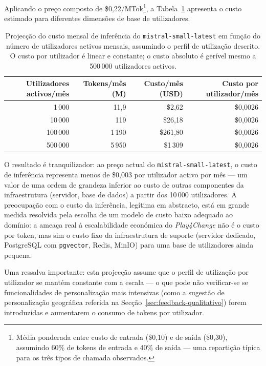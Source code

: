 Aplicando o preço composto de \$0,22/MTok\footnote{Média ponderada entre custo de entrada (\$0,10) e de saída (\$0,30), assumindo 60\% de tokens de entrada e 40\% de saída --- uma repartição típica para os três tipos de chamada observados.}, a Tabela~\ref{tab:custo-escala} apresenta o custo estimado para diferentes dimensões de base de utilizadores.

\begin{table}[h]
    \centering
    \small
    \begin{tabular}{r r r r}
        \toprule
        \textbf{Utilizadores activos/mês} &
        \textbf{Tokens/mês (M)} &
        \textbf{Custo/mês (USD)} &
        \textbf{Custo por utilizador/mês} \\
        \midrule
        1\,000   & 11,9  & \$2,62    & \$0,0026 \\
        10\,000  & 119   & \$26,18   & \$0,0026 \\
        100\,000 & 1\,190 & \$261,80 & \$0,0026 \\
        500\,000 & 5\,950 & \$1\,309  & \$0,0026 \\
        \bottomrule
    \end{tabular}
    \caption[Projecção de custo de inferência a escala]{Projecção do custo mensal de inferência do \texttt{mistral-small-latest} em função do número de utilizadores activos mensais, assumindo o perfil de utilização descrito. O custo por utilizador é linear e constante; o custo absoluto é gerível mesmo a 500\,000 utilizadores activos.}
    \label{tab:custo-escala}
\end{table}

O resultado é tranquilizador: ao preço actual do \texttt{mistral-small-latest}, o custo de inferência representa menos de \$0,003 por utilizador activo por mês --- um valor de uma ordem de grandeza inferior ao custo de outras componentes da infraestrutura (servidor, base de dados) a partir dos 10\,000 utilizadores. A preocupação com o custo da inferência, legítima em abstracto, está em grande medida resolvida pela escolha de um modelo de custo baixo adequado ao domínio: a ameaça real à escalabilidade económica do \emph{Play4Change} não é o custo por token, mas sim o custo fixo da infraestrutura de suporte (servidor dedicado, PostgreSQL com \texttt{pgvector}, Redis, MinIO) para uma base de utilizadores ainda pequena.

Uma ressalva importante: esta projecção assume que o perfil de utilização por utilizador se mantém constante com a escala --- o que pode não verificar-se se funcionalidades de personalização mais intensivas (como a sugestão de personalização geográfica referida na Secção~\ref{sec:feedback-qualitativo}) forem introduzidas e aumentarem o consumo de tokens por utilizador.
